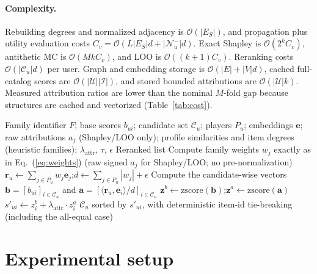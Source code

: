 \documentclass[pdflatex,sn-mathphys-num]{sn-jnl}
\begin{document}
\paragraph{Complexity.} Rebuilding degrees and normalized adjacency is $\mathcal{O}(|E_S|)$, and propagation plus utility evaluation costs $C_v=\mathcal{O}(L|E_S|d+|\mathcal{N}_u^-|d)$. Exact Shapley is $\mathcal{O}(2^kC_v)$, antithetic MC is $\mathcal{O}(MkC_v)$, and LOO is $\mathcal{O}((k+1)C_v)$. Reranking costs $\mathcal{O}(|\mathcal{C}_u|d)$ per user. Graph and embedding storage is $\mathcal{O}(|E|+|V|d)$, cached full-catalog scores are $\mathcal{O}(|\mathcal{U}||\mathcal{I}|)$, and stored bounded attributions are $\mathcal{O}(|\mathcal{U}|k)$. Measured attribution ratios are lower than the nominal $M$-fold gap because structures are cached and vectorized (Table~\ref{tab:cost}).


\begin{algorithm}[t]
\caption{Attribution-Guided Reranking}\label{alg:rerank}
\begin{algorithmic}[1]
\Require Family identifier $F$; base scores $b_{ui}$; candidate set $\mathcal{C}_u$; players $P_u$; embeddings $\mathbf{e}$; raw attributions $a_j$ (Shapley/LOO only); profile similarities and item degrees (heuristic families); $\lambda_{\text{attr}}$, $\tau$, $\epsilon$
\Ensure Reranked list
\State Compute family weights $w_j$ exactly as in Eq.~(\ref{eq:weights}) (raw signed $a_j$ for Shapley/LOO; no pre-normalization)
\State $\mathbf{r}_u \gets \sum_{j\in P_u} w_j \mathbf{e}_j$;\quad $d \gets \sum_{j\in P_u}|w_j|+\epsilon$ 
\State Compute the candidate-wise vectors $\mathbf{b}=[b_{ui}]_{i\in\mathcal{C}_u}$ and $\mathbf{a}=[\langle\mathbf{r}_u,\mathbf{e}_i\rangle/d]_{i\in\mathcal{C}_u}$
\State $\mathbf{z}^{b}\gets\mathrm{zscore}(\mathbf{b})$;\quad $\mathbf{z}^{a}\gets\mathrm{zscore}(\mathbf{a})$ 
\State $s'_{ui} \gets z^{b}_i + \lambda_{\text{attr}}\cdot z^{a}_i$
\EndFor
\State \Return $\mathcal{C}_u$ sorted by $s'_{ui}$, with deterministic item-id tie-breaking (including the all-equal case)
\end{algorithmic}
\end{algorithm}
\section{Experimental setup}\label{sec:protocol_details}\label{sec:case_study}
\end{document}

